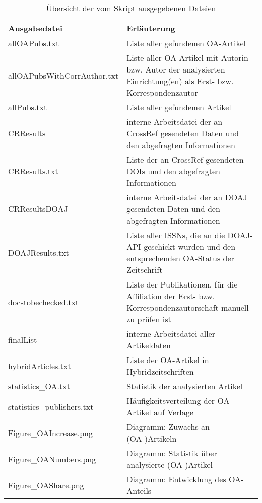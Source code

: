 \begin{appendices}
\begin{table}[h]
\caption{Übersicht der vom Skript ausgegebenen Dateien}
    \begin{tabularx}{1\textwidth}{p{5cm}p{9cm}}
    \toprule
     Ausgabedatei & Erläuterung \\
     \midrule
    allOAPubs.txt & Liste aller gefundenen OA-Artikel \\
    allOAPubsWithCorrAuthor.txt & Liste aller OA-Artikel mit Autorin bzw. Autor der analysierten Einrichtung(en) als Erst- bzw. Korrespondenzautor \\
    allPubs.txt & Liste aller gefundenen Artikel \\
    CRResults & interne Arbeitsdatei der an CrossRef gesendeten Daten und den abgefragten Informationen \\
    CRResults.txt & Liste der an CrossRef gesendeten DOIs und den abgefragten Informationen \\
    CRResultsDOAJ & interne Arbeitsdatei der an DOAJ gesendeten Daten und den abgefragten Informationen \\
    DOAJResults.txt & Liste aller ISSNs, die an die DOAJ-API geschickt wurden und den entsprechenden OA-Status der Zeitschrift \\
    docstobechecked.txt & Liste der Publikationen, für die Affiliation der Erst- bzw. Korrespondenzautorschaft manuell zu prüfen ist \\
    finalList & interne Arbeitsdatei aller Artikeldaten \\
    hybridArticles.txt & Liste der OA-Artikel in Hybridzeitschriften \\
    statistics\_OA.txt & Statistik der analysierten Artikel \\
    statistics\_publishers.txt & Häufigkeitsverteilung der OA-Artikel auf Verlage \\
    \midrule
    Figure\_OAIncrease.png & Diagramm: Zuwachs an (OA-)Artikeln \\
    Figure\_OANumbers.png & Diagramm: Statistik über analysierte (OA-)Artikel \\
    Figure\_OAShare.png & Diagramm: Entwicklung des OA-Anteils \\
    \bottomrule
    \end{tabularx}
\end{table}

\end{appendices}